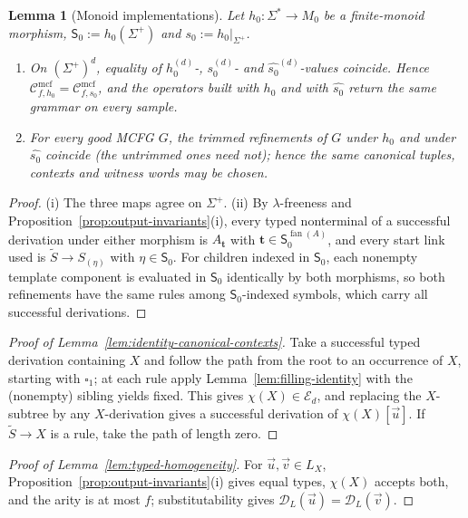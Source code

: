\documentclass[11pt]{article}
\numberwithin{equation}{section}
\theoremstyle{plain}
\newtheorem{lemma}[theorem]{Lemma}
\theoremstyle{definition}
\theoremstyle{remark}
\newcommand{\Cmcf}[2]{\mathcal{C}^{\mathrm{mcf}}_{#1,#2}}
\newcommand{\D}{\mathcal{D}}
\newcommand{\tuple}[1]{\vec{#1}}
\newcommand{\blank}{\square}
\newcommand{\fan}{\operatorname{fan}}
\begin{document}
\begin{lemma}[Monoid implementations]
\label{lem:semigroup-transfer}
Let $h_0:\Sigma^*\to M_0$ be a finite-monoid morphism, $\mathsf S_0:=h_0(\Sigma^+)$ and
$s_0:=h_0|_{\Sigma^+}$.
\begin{enumerate}[label=\textup{(\roman*)}]
\item On $(\Sigma^+)^d$, equality of $h_0^{(d)}$-, $s_0^{(d)}$- and
$\widehat{s_0}^{(d)}$-values coincide.  Hence $\Cmcf{f}{h_0}=\Cmcf{f}{s_0}$, and the
operators built with $h_0$ and with $\widehat{s_0}$ return the same grammar on every
sample.
\item For every good MCFG $G$, the trimmed refinements of $G$ under $h_0$ and under
$\widehat{s_0}$ coincide (the untrimmed ones need not); hence the same canonical
tuples, contexts and witness words may be chosen.
\end{enumerate}
\end{lemma}

\begin{proof}
(i) The three maps agree on $\Sigma^+$.  (ii) By $\lambda$-freeness and
Proposition~\ref{prop:output-invariants}(i), every typed nonterminal of a successful
derivation under either morphism is $A_{\mathbf t}$ with $\mathbf t\in \mathsf S_0^{\fan(A)}$, and
every start link used is $\widetilde S\to S_{(\eta)}$ with $\eta\in \mathsf S_0$.  For children
indexed in $\mathsf S_0$, each nonempty template component is evaluated in $\mathsf S_0$ identically by
both morphisms, so both refinements have the same rules among $\mathsf S_0$-indexed symbols,
which carry all successful derivations.
\end{proof}

\begin{proof}[Proof of Lemma~\ref{lem:identity-canonical-contexts}]
Take a successful typed derivation containing $X$ and follow the path from the root to
an occurrence of $X$, starting with $\blank_1$; at each rule apply
Lemma~\ref{lem:filling-identity} with the (nonempty) sibling yields fixed.  This gives
$\chi(X)\in\mathcal E_d$, and replacing the $X$-subtree by any $X$-derivation gives a
successful derivation of $\chi(X)[\tuple u]$.  If $\widetilde S\to X$ is a rule, take the
path of length zero.
\end{proof}

\begin{proof}[Proof of Lemma~\ref{lem:typed-homogeneity}]
For $\tuple u,\tuple v\in L_X$, Proposition~\ref{prop:output-invariants}(i) gives equal
types, $\chi(X)$ accepts both, and the arity is at most $f$; substitutability gives
$\D_L(\tuple u)=\D_L(\tuple v)$.
\end{proof}
\end{document}
